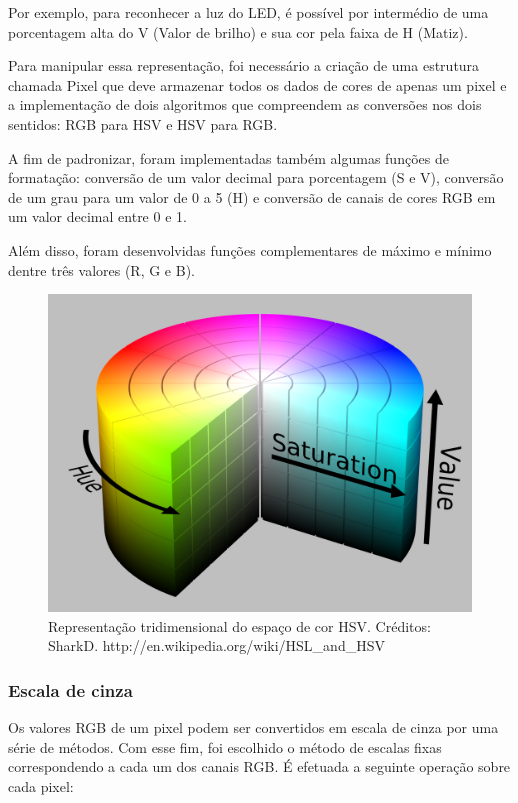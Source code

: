 \documentclass[12pt]{article}
\begin{document}
Por exemplo, para reconhecer a luz do LED, \'e poss\'ivel por interm\'edio de uma porcentagem alta
do V (Valor de brilho) e sua cor pela faixa de H (Matiz).

Para manipular essa representa\c c\~ao, foi necess\'ario a cria\c c\~ao de uma estrutura chamada Pixel
que deve armazenar todos os dados de cores de apenas um pixel e a implementa\c c\~ao de dois algoritmos
que compreendem as convers\~oes nos dois sentidos: RGB para HSV e HSV para RGB.

A fim de padronizar, foram implementadas tamb\'em algumas fun\c c\~oes de formata\c c\~ao: convers\~ao de
um valor decimal para porcentagem (S e V), convers\~ao de um grau para um valor de 0 a 5 (H) e convers\~ao
de canais de cores RGB em um valor decimal entre 0 e 1.

Al\'em disso, foram desenvolvidas fun\c c\~oes complementares de m\'aximo e m\'inimo dentre tr\^es valores (R, G e B).

	\begin{figure}[ht!]
	\begin{center}
		\includegraphics[scale=0.15]{img/HSV_color_solid_cylinder_alpha_lowgamma.png}
		\footnotesize \caption{Representa\c c\~ao tridimensional do espa\c co de cor HSV. Cr\'editos: SharkD. http://en.wikipedia.org/wiki/HSL\_and\_HSV }
	\end{center}
	\end{figure}	


\subsubsection{Escala de cinza}
Os valores RGB de um pixel podem ser convertidos em escala de cinza por uma s\'erie de m\'etodos.
Com esse fim, foi escolhido o m\'etodo de escalas fixas correspondendo a cada um dos canais RGB.
\'E efetuada a seguinte opera\c c\~ao sobre cada pixel:
\end{document}
